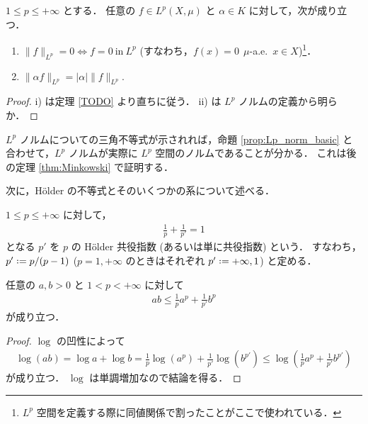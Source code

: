 \begin{proposition}\label{prop:Lp_norm_basic}
    $1\le p\le+\infty$ とする．
    任意の $f\in L^p(X,\mu)$ と $\alpha\in K$ に対して，次が成り立つ．
    \begin{enumerate}
        \item $\|f\|_{L^p}=0\iff f=0\ \text{in}\ L^p$ (すなわち，$f(x)=0\ \ \mu$-a.e.\ $x\in X$)\footnote{
            $L^p$ 空間を定義する際に同値関係で割ったことがここで使われている．
        }．
        \item $\|\alpha f\|_{L^p}=|\alpha|\|f\|_{L^p}.$
    \end{enumerate}
\end{proposition}

\begin{proof}
    \textrm{i)} は定理 \ref{TODO} より直ちに従う．
    \textrm{ii)} は $L^p$ ノルムの定義から明らか．
\end{proof}

$L^p$ ノルムについての三角不等式が示されれば，命題 \ref{prop:Lp_norm_basic} と合わせて，$L^p$ ノルムが実際に $L^p$ 空間のノルムであることが分かる．
これは後の定理 \ref{thm:Minkowski} で証明する．

次に，H\"older の不等式とそのいくつかの系について述べる．

\begin{definition}
    $1\le p\le+\infty$ に対して，
    \begin{align*}
        \frac{1}{p}+\frac{1}{p'}=1
    \end{align*}
    となる $p'$ を $p$ の H\"older 共役指数 (あるいは単に共役指数) という．
    すなわち，$p'\defeq p/(p-1)$ ($p=1,+\infty$ のときはそれぞれ $p'\defeq+\infty,1$) と定める．
\end{definition}

\begin{proposition}\label{prop:Young}
    任意の $a,b>0$ と $1<p<+\infty$ に対して
    \begin{align*}
        ab\le\frac{1}{p}a^p+\frac{1}{p'}b^p
    \end{align*}
    が成り立つ．
\end{proposition}

\begin{proof}
    $\log$ の凹性によって
    \begin{align*}
        \log(ab)
        =\log a+\log b
        =\frac{1}{p}\log(a^p)+\frac{1}{p'}\log(b^{p'})
        \le\log\!\left(\frac{1}{p}a^p+\frac{1}{p'}b^{p'}\right)
    \end{align*}
    が成り立つ．
    $\log$ は単調増加なので結論を得る．
\end{proof}

